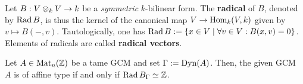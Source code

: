             \begin{definition} \label{def: radicals_of_bilinear_forms}
                Let $B: V \tensor_k V \to k$ be a \textit{symmetric} $k$-bilinear form. The \textbf{radical} of $B$, denoted by $\operatorname{Rad} B$, is thus the kernel of the canonical map $V \to \mathrm{Hom}_k(V, k)$ given by $v \mapsto B(-, v)$. Tautologically, one has $\operatorname{Rad} B := \{x \in V \mid \forall v \in V: B(x, v) = 0\}$. Elements of radicals are called \textbf{radical vectors}. 
            \end{definition}
            \begin{proposition} \label{prop: affineness_criterion_via_radicals}
                 \cite[Theorem 4.2.1(2)]{krause_quiver_representations_via_reflection_functors} Let $A \in \mathrm{Mat}_n(\mathbb{Z})$ be a tame GCM and set $\Gamma := \mathrm{Dyn}(A)$. Then, the given GCM $A$ is of affine type if and only if $\operatorname{Rad} B_{\Gamma} \simeq \mathbb{Z}$.
            \end{proposition}
                
